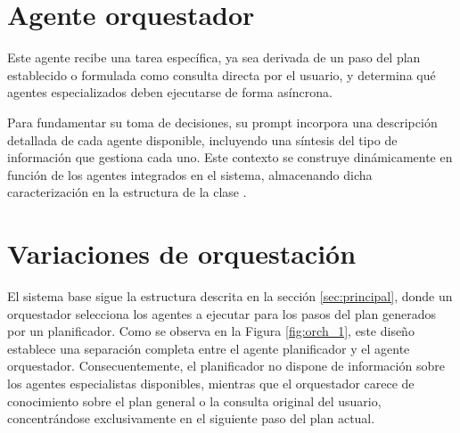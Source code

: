 \section{Agente orquestador}
Este agente recibe una tarea específica, ya sea derivada de un paso del plan establecido o formulada como consulta directa por el usuario, y determina qué agentes especializados deben ejecutarse de forma asíncrona.

Para fundamentar su toma de decisiones, su prompt incorpora una descripción detallada de cada agente disponible, incluyendo una síntesis del tipo de información que gestiona cada uno. Este contexto se construye dinámicamente en función de los agentes integrados en el sistema, almacenando dicha caracterización en la estructura de la clase .

\section{Variaciones de orquestación}
\label{sec:vars}
El sistema base sigue la estructura descrita en la sección \ref{sec:principal}, donde un orquestador selecciona los agentes a ejecutar para los pasos del plan generados por un planificador. Como se observa en la Figura \ref{fig:orch_1}, este diseño establece una separación completa entre el agente planificador y el agente orquestador. Consecuentemente, el planificador no dispone de información sobre los agentes especialistas disponibles, mientras que el orquestador carece de conocimiento sobre el plan general o la consulta original del usuario, concentrándose exclusivamente en el siguiente paso del plan actual.

